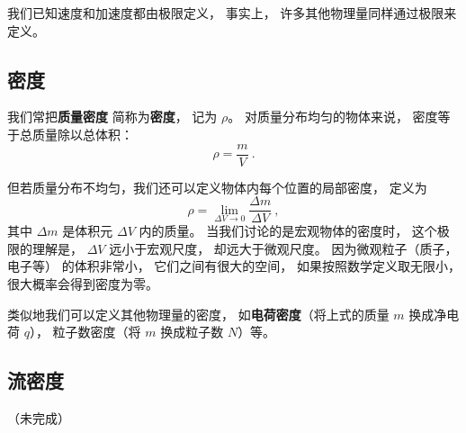 
\begin{issues}
\issueDraft
\end{issues}



我们已知速度和加速度都由极限定义， 事实上， 许多其他物理量同样通过极限来定义。

\subsection{密度}
我们常把\textbf{质量密度} 简称为\textbf{密度}， 记为 $\rho$。 对质量分布均匀的物体来说， 密度等于总质量除以总体积：
\begin{equation}
\rho = \frac{m}{V}~.
\end{equation}

但若质量分布不均匀，我们还可以定义物体内每个位置的局部密度， 定义为
\begin{equation}
\rho = \lim_{\Delta V \to 0} \frac{\Delta m}{\Delta V}~,
\end{equation}
其中 $\Delta m$ 是体积元 $\Delta V$ 内的质量。 当我们讨论的是宏观物体的密度时， 这个极限的理解是， $\Delta V$ 远小于宏观尺度， 却远大于微观尺度。 因为微观粒子（质子， 电子等） 的体积非常小， 它们之间有很大的空间， 如果按照数学定义取无限小， 很大概率会得到密度为零。

类似地我们可以定义其他物理量的密度， 如\textbf{电荷密度}（将上式的质量 $m$ 换成净电荷 $q$）， 粒子数密度（将 $m$ 换成粒子数 $N$）等。





\subsection{流密度}
（未完成）




